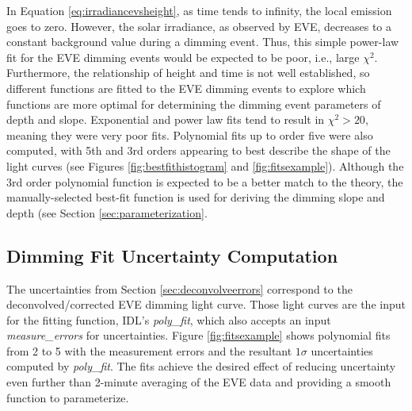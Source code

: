 In Equation \ref{eq:irradiancevsheight}, as time tends to infinity, the local emission goes to zero. However, the solar irradiance, as observed by EVE, decreases to a constant background value during a dimming event. Thus, this simple power-law fit for the EVE dimming events would be expected to be poor, i.e., large $\chi^2$. Furthermore, the relationship of height and time is not well established, so different functions are fitted to the EVE dimming events to explore which functions are more optimal for determining the dimming event parameters of depth and slope. Exponential and power law fits tend to result in $\chi^2 > 20$, meaning they were very poor fits. Polynomial fits up to order five were also computed, with 5th and 3rd orders appearing to best describe the shape of the light curves (see Figures \ref{fig:bestfithistogram} and \ref{fig:fitsexample}). Although the 3rd order polynomial function is expected to be a better match to the theory, the manually-selected best-fit function is used for deriving the dimming slope and depth (see Section \ref{sec:parameterization}. 

\subsection{Dimming Fit Uncertainty Computation}
The uncertainties from Section \ref{sec:deconvolveerrors} correspond to the deconvolved/corrected EVE dimming light curve. Those light curves are the input for the fitting function, IDL's \textit{poly{\_}fit}, which also accepts an input \textit{measure{\_}errors} for uncertainties. Figure \ref{fig:fitsexample} shows polynomial fits from 2 to 5 with the measurement errors and the resultant $1\sigma$ uncertainties computed by \textit{poly{\_}fit}. The fits achieve the desired effect of reducing uncertainty even further than 2-minute averaging of the EVE data and providing a smooth function to parameterize.


